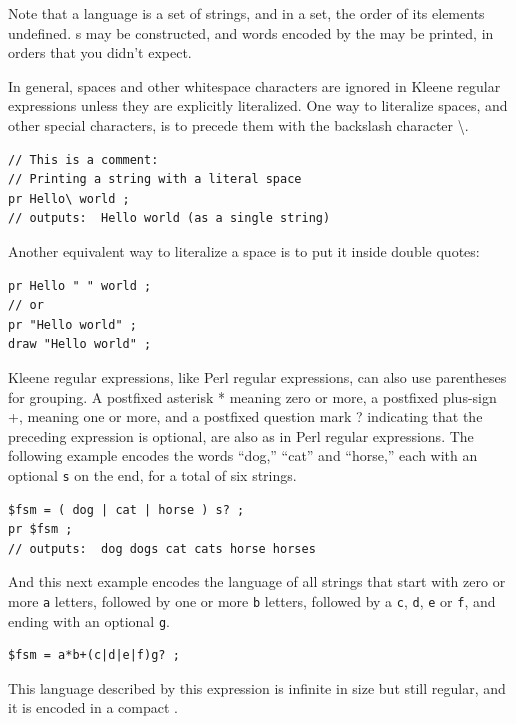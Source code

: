\noindent
Note that a language is a set of strings, and in a set, the order of its elements 
undefined.  \fsm{}s may be constructed, and words encoded by the \fsm{}
may be printed, in orders that you didn't expect.

In general, spaces and other whitespace characters are ignored in Kleene regular
expressions unless they are explicitly literalized.  
One way to literalize spaces, and other
special characters, is to precede them with the backslash character \textbackslash.

\begin{Verbatim}
// This is a comment:
// Printing a string with a literal space
pr Hello\ world ;
// outputs:  Hello world (as a single string)
\end{Verbatim}

\noindent
Another equivalent way to literalize a space is to put it inside double quotes:

\begin{Verbatim}
pr Hello " " world ;
// or
pr "Hello world" ;
draw "Hello world" ;
\end{Verbatim}

Kleene regular expressions, like Perl regular expressions, can also use parentheses for
grouping.  A postfixed asterisk * meaning zero or more, a postfixed plus-sign +,
meaning one or more, and a postfixed question mark ? indicating that the preceding
expression is optional, are also as in Perl regular expressions.
The following example encodes the words ``dog,'' ``cat'' and
``horse,'' each with an optional \texttt{s} on the end, for a total of six strings.

\begin{Verbatim}
$fsm = ( dog | cat | horse ) s? ;
pr $fsm ;
// outputs:  dog dogs cat cats horse horses
\end{Verbatim}

\noindent
And this next example encodes the language of all strings that start with zero or more
\texttt{a} letters, followed by one or more \texttt{b} letters, followed by a
\texttt{c}, \texttt{d}, \texttt{e} or \texttt{f}, and ending with an optional
\texttt{g}.

\begin{Verbatim}
$fsm = a*b+(c|d|e|f)g? ;
\end{Verbatim}

\noindent
This language described by this expression is infinite in size but still regular, and it is
encoded in a compact \fsm{}.


